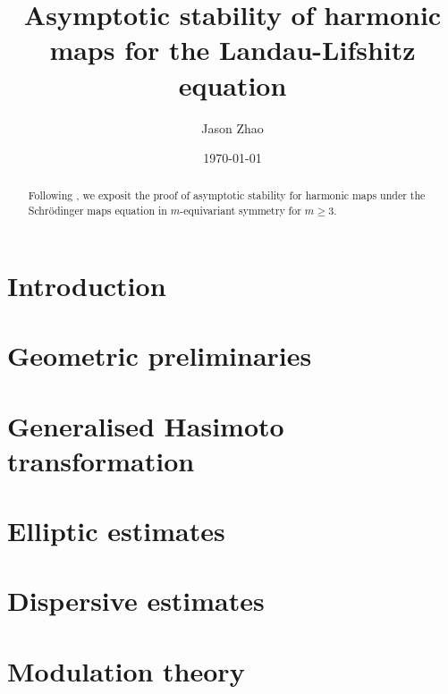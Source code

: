 \documentclass[reqno]{amsart}
\title
{
	Asymptotic stability of harmonic maps for the Landau-Lifshitz equation
}
\author{Jason Zhao}
\date{\today}
\begin{document}
\begin{abstract}
	Following \cite{GustafsonEtAl2010}, we exposit the proof of asymptotic stability for harmonic maps under the Schr\"odinger maps equation in $m$-equivariant symmetry for $m \geq 3$. 
\end{abstract}
\maketitle

\tableofcontents

\section{Introduction}


\section{Geometric preliminaries}


\section{Generalised Hasimoto transformation}


\section{Elliptic estimates}


\section{Dispersive estimates}


\section{Modulation theory}


\appendix

\section{}




\end{document}
